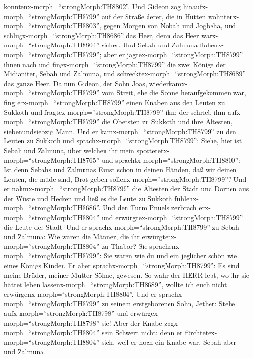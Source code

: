 konntenx-morph=``strongMorph:TH8802''.  Und Gideon zog
hinaufx-morph=``strongMorph:TH8799'' auf der Straße derer, die in Hütten
wohntenx-morph=``strongMorph:TH8803'', gegen Morgen von Nobah und
Jogbeha, und schlugx-morph=``strongMorph:TH8686'' das Heer, denn das
Heer warx-morph=``strongMorph:TH8804'' sicher.  Und Sebah
und Zalmuna flohenx-morph=``strongMorph:TH8799''; aber er
jagtex-morph=``strongMorph:TH8799'' ihnen nach und
fingx-morph=``strongMorph:TH8799'' die zwei Könige der Midianiter, Sebah
und Zalmuna, und schrecktex-morph=``strongMorph:TH8689'' das ganze Heer.
 Da nun Gideon, der Sohn Joas,
wiederkamx-morph=``strongMorph:TH8799'' vom Streit, ehe die Sonne
heraufgekommen war,  fing erx-morph=``strongMorph:TH8799''
einen Knaben aus den Leuten zu Sukkoth und
fragtex-morph=``strongMorph:TH8799'' ihn; der schrieb ihm
aufx-morph=``strongMorph:TH8799'' die Obersten zu Sukkoth und ihre
Ältesten, siebenundsiebzig Mann.  Und er
kamx-morph=``strongMorph:TH8799'' zu den Leuten zu Sukkoth und
sprachx-morph=``strongMorph:TH8799'': Siehe, hier ist Sebah und Zalmuna,
über welchen ihr mein spottetetx-morph=``strongMorph:TH8765'' und
sprachtx-morph=``strongMorph:TH8800'': Ist denn Sebahs und Zalmunas
Faust schon in deinen Händen, daß wir deinen Leuten, die müde sind, Brot
geben sollenx-morph=``strongMorph:TH8799''?  Und er
nahmx-morph=``strongMorph:TH8799'' die Ältesten der Stadt und Dornen aus
der Wüste und Hecken und ließ es die Leute zu Sukkoth
fühlenx-morph=``strongMorph:TH8686''.  Und den Turm Pnuels
zerbrach erx-morph=``strongMorph:TH8804'' und
erwürgtex-morph=``strongMorph:TH8799'' die Leute der Stadt.
 Und er sprachx-morph=``strongMorph:TH8799'' zu Sebah und
Zalmuna: Wie waren die Männer, die ihr
erwürgtetx-morph=``strongMorph:TH8804'' zu Thabor? Sie
sprachenx-morph=``strongMorph:TH8799'': Sie waren wie du und ein
jeglicher schön wie eines Königs Kinder.  Er aber
sprachx-morph=``strongMorph:TH8799'': Es sind meine Brüder, meiner
Mutter Söhne, gewesen. So wahr der HERR lebt, wo ihr sie hättet leben
lassenx-morph=``strongMorph:TH8689'', wollte ich euch nicht
erwürgenx-morph=``strongMorph:TH8804''.  Und er
sprachx-morph=``strongMorph:TH8799'' zu seinem erstgeborenen Sohn,
Jether: Stehe aufx-morph=``strongMorph:TH8798'' und
erwürgex-morph=``strongMorph:TH8798'' sie! Aber der Knabe
zogx-morph=``strongMorph:TH8804'' sein Schwert nicht; denn er
fürchtetex-morph=``strongMorph:TH8804'' sich, weil er noch ein Knabe
war.  Sebah aber und Zalmuna
